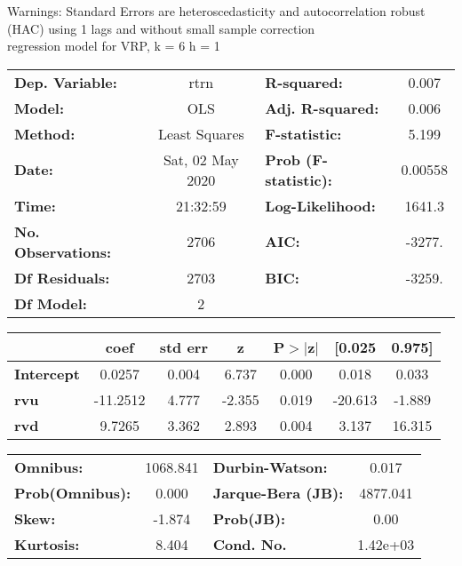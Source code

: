 Warnings: \newline
 [1] Standard Errors are heteroscedasticity and autocorrelation robust (HAC) using 1 lags and without small sample correction\\ 

regression model for VRP, k = 6 h = 1\begin{center}
\begin{tabular}{lclc}
\toprule
\textbf{Dep. Variable:}    &       rtrn       & \textbf{  R-squared:         } &     0.007   \\
\textbf{Model:}            &       OLS        & \textbf{  Adj. R-squared:    } &     0.006   \\
\textbf{Method:}           &  Least Squares   & \textbf{  F-statistic:       } &     5.199   \\
\textbf{Date:}             & Sat, 02 May 2020 & \textbf{  Prob (F-statistic):} &  0.00558    \\
\textbf{Time:}             &     21:32:59     & \textbf{  Log-Likelihood:    } &    1641.3   \\
\textbf{No. Observations:} &        2706      & \textbf{  AIC:               } &    -3277.   \\
\textbf{Df Residuals:}     &        2703      & \textbf{  BIC:               } &    -3259.   \\
\textbf{Df Model:}         &           2      & \textbf{                     } &             \\
\bottomrule
\end{tabular}
\begin{tabular}{lcccccc}
                   & \textbf{coef} & \textbf{std err} & \textbf{z} & \textbf{P$> |$z$|$} & \textbf{[0.025} & \textbf{0.975]}  \\
\midrule
\textbf{Intercept} &       0.0257  &        0.004     &     6.737  &         0.000        &        0.018    &        0.033     \\
\textbf{rvu}       &     -11.2512  &        4.777     &    -2.355  &         0.019        &      -20.613    &       -1.889     \\
\textbf{rvd}       &       9.7265  &        3.362     &     2.893  &         0.004        &        3.137    &       16.315     \\
\bottomrule
\end{tabular}
\begin{tabular}{lclc}
\textbf{Omnibus:}       & 1068.841 & \textbf{  Durbin-Watson:     } &    0.017  \\
\textbf{Prob(Omnibus):} &   0.000  & \textbf{  Jarque-Bera (JB):  } & 4877.041  \\
\textbf{Skew:}          &  -1.874  & \textbf{  Prob(JB):          } &     0.00  \\
\textbf{Kurtosis:}      &   8.404  & \textbf{  Cond. No.          } & 1.42e+03  \\
\bottomrule
\end{tabular}
\end{center}

